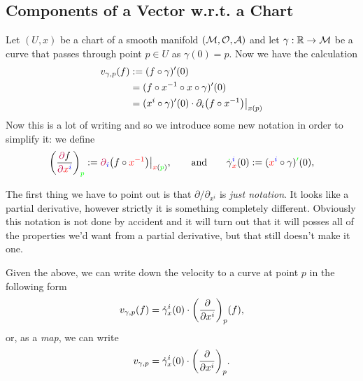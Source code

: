 \documentclass[12pt]{article} %
\begin{document}
\subsection{Components of a Vector w.r.t. a Chart}

Let $(U,x)$ be a chart of a smooth manifold $(\mathcal{M},\mathcal{O},\mathcal{A})$ and let $\gamma:\mathbb{R}\to \mathcal{M}$ be a curve that passes through point $p\in U$ as $\gamma(0)=p$. Now we have the calculation 
\begin{align*} 
    \begin{split}
        v_{\gamma,p}(f)& := (f\circ \gamma)'(0) \\
        & = (f\circ x^{-1}\circ x \circ \gamma)'(0) \\
        & = (x^i\circ \gamma)'(0) \cdot \partial_i \big( f\circ x^{-1}\big)\big|_{x(p)}
    \end{split}
\end{align*}
Now this is a lot of writing and so we introduce some new notation in order to simplify it: we define 
\begin{align*} 
    \bigg(\frac{\textcolor{purple}{\partial} f}{\textcolor{purple}{\partial} \textcolor{red}{x}^{\textcolor{blue}{i}}}\bigg)_{\textcolor{green}{p}} := \textcolor{purple}{\partial}_{\textcolor{blue}{i}} \big( f \circ \textcolor{red}{x^{-1}}\big) \big|_{\textcolor{red}{x}(\textcolor{green}{p})}, \qquad \text{and} \qquad \textcolor{green}{\dot{\textcolor{black}{\gamma}}}_{\textcolor{red}{x}}^{\textcolor{blue}{i}}(0) := (\textcolor{red}{x}^{\textcolor{blue}{i}}\circ \gamma){\textcolor{green}{'}}(0),
\end{align*}
\begin{rema}
The first thing we have to point out is that $\partial/\partial_{x^i}$ is \textit{just notation}. It looks like a partial derivative, however strictly it is something completely different. Obviously this notation is not done by accident and it will turn out that it will posses all of the properties we'd want from a partial derivative, but that still doesn't make it one. 
\end{rema}

Given the above, we can write down the velocity to a curve at point $p$ in the following form 
\begin{align*} 
    v_{\gamma,p}(f) = \dot{\gamma}^i_x(0) \cdot \bigg(\frac{\partial}{\partial x^i}\bigg)_p (f),
\end{align*} 
or, as a \textit{map}, we can write 
\begin{align*} 
    v_{\gamma,p} = \dot{\gamma}^i_x(0) \cdot \bigg(\frac{\partial}{\partial x^i}\bigg)_p.
\end{align*} 
\end{document}

